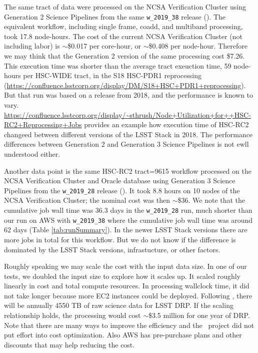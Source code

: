 The same tract of data were processed on the NCSA Verification Cluster using Generation 2 Science Pipelines from the same \texttt{w\_2019\_38} release ().
The equivalent workflow, including single frame, coadd, and multiband processing, took 17.8 node-hours.
The cost of the current NCSA Verification Cluster (not including labor) is $\sim$\$0.017 per core-hour, or $\sim$\$0.408 per node-hour.
Therefore we may think that the Generation 2 version of the same processing cost \$7.26.
This execution time was shorter than the average tract exeuction time, 59 node-hours per HSC-WIDE tract, in the S18 HSC-PDR1 reprocessing (\url{https://confluence.lsstcorp.org/display/DM/S18+HSC+PDR1+reprocessing}).
But that run was based on a release from 2018, and the performance is known to vary.
\url{https://confluence.lsstcorp.org/display/~sthrush/Node+Utilization+for++HSC-RC2+Reprocessing+Jobs} provides an example how execution time of HSC-RC2 changeed between different versions of the LSST Stack in 2018.
The performance differences between Generation 2 and Generation 3 Science Pipelines is not ewll understood either.

Another data point is the same HSC-RC2 tract=9615 workflow processed on the NCSA Verification Cluster and Oracle database using Generation 3 Science Pipelines from the \texttt{w\_2019\_28} release ().
It took 8.8 hours on 10 nodes of the NCSA Verification Cluster; the nominal cost was then $\sim$\$36.
We note that the cumulative job wall time was 36.3 days in the \texttt{w\_2019\_28} run, much shorter than our run on AWS with \texttt{w\_2019\_38} where the cumulative job wall time was around 62 days (Table \ref{tab:runSummary}).
In the newer LSST Stack versions there are more jobs in total for this workflow.
But we do not know if the difference is dominated by the LSST Stack versions, infrastucture, or other factors.

Roughly speaking we may scale the cost with the input data size.
In one of our tests, we doubled the input size to explore how it scales up.
It scaled roughly linearly in cost and total compute resources.
In processing wallclock time, it did not take longer because more EC2 instances could be deployed.
Following , there will be annually 4550 TB of raw science data for LSST DRP.
If the scaling relationship holds, the processing would cost $\sim$\$3.5 million for one year of DRP.
Note that there are many ways to improve the efficiency and the \poc~project did not put effort into cost optimization.
Also AWS has pre-purchase plans and other discounts that may help reducing the cost.


